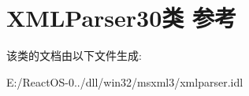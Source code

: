 \hypertarget{class_x_m_l_parser30}{}\section{X\+M\+L\+Parser30类 参考}
\label{class_x_m_l_parser30}


该类的文档由以下文件生成\+:\begin{DoxyCompactItemize}
\item 
E\+:/\+React\+O\+S-\/0../dll/win32/msxml3/xmlparser.\+idl\end{DoxyCompactItemize}
